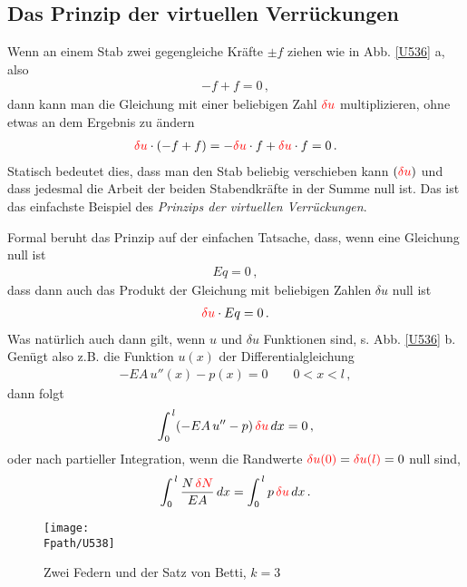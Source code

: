 {%
{\textcolor{sectionTitleBlue}{\subsection{Das Prinzip der virtuellen Verr\"{u}ckungen }}
Wenn an einem Stab zwei gegengleiche Kr\"{a}fte $\pm f$ ziehen wie in Abb. \ref{U536} a, also
\begin{align}
-f + f = 0\,,
\end{align}
dann kann man die Gleichung mit einer beliebigen Zahl $\textcolor{red}{\delta u}$ multiplizieren, ohne etwas an dem Ergebnis zu \"{a}ndern
\begin{align}
\textcolor{red}{\delta u} \cdot (-f + f) = - \textcolor{red}{\delta u}\cdot f + \textcolor{red}{\delta u} \cdot f = 0\,.
\end{align}
Statisch bedeutet dies, dass man den Stab beliebig verschieben kann $(\textcolor{red}{\delta u})$ und dass jedesmal die Arbeit der beiden Stabendkr\"{a}fte in der Summe null ist. Das ist das einfachste Beispiel des {\em Prinzips der virtuellen Verr\"{u}ckungen\/}.

Formal beruht das Prinzip auf der einfachen Tatsache, dass, wenn eine Gleichung null ist
\begin{align}
Eq = 0\,,
\end{align}
dass dann auch das Produkt der Gleichung mit beliebigen Zahlen $\delta u$ null ist
\begin{align}
\textcolor{red}{\delta u} \cdot Eq = 0\,.
\end{align}
Was nat\"{u}rlich auch dann gilt, wenn $u$ und $\delta u$ Funktionen sind, s. Abb. \ref{U536} b. Gen\"{u}gt also z.B. die Funktion $u(x)$ der Differentialgleichung
\begin{align}
- EA\,u''(x) - p(x) = 0 \qquad 0 < x < l \,,
\end{align}
dann folgt
\begin{align}
\int_0^{\,l} (-EA\,u'' - p)\,\textcolor{red}{\delta u}\,dx = 0\,,
\end{align}
oder nach partieller Integration, wenn die Randwerte $\textcolor{red}{\delta u(0)} = \textcolor{red}{\delta u(l)} = 0$ null sind,
\begin{align}
\int_0^{\,l} \frac{N\,\textcolor{red}{\delta N}}{EA}\,dx = \int_0^{\,l} p\,\textcolor{red}{\delta u}\,dx\,.
\end{align}
\begin{figure}[tbp]
\centering
\if {} \sidecaption \fi
\texttt{[image: \\Fpath/U538]}
\caption{ Zwei Federn und der Satz von Betti, $k = 3$} \label{U538}
%
\end{figure}%

}}
